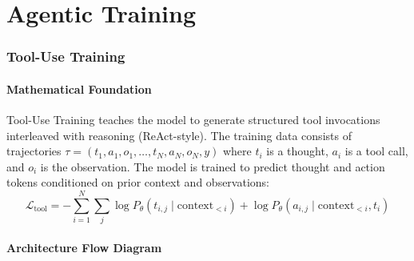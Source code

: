 \newpage
\part{Agentic Training}

\section{Tool-Use Training}

\subsection{Mathematical Foundation}
Tool-Use Training teaches the model to generate structured tool invocations interleaved with reasoning (ReAct-style). The training data consists of trajectories $\tau = (t_1, a_1, o_1, \ldots, t_N, a_N, o_N, y)$ where $t_i$ is a thought, $a_i$ is a tool call, and $o_i$ is the observation. The model is trained to predict thought and action tokens conditioned on prior context and observations:
\begin{equation}
  \mathcal{L}_{\text{tool}} = -\sum_{i=1}^N \sum_j \log P_\theta(t_{i,j} \mid \text{context}_{<i}) + \log P_\theta(a_{i,j} \mid \text{context}_{<i}, t_i)
\end{equation}

\subsection{Architecture Flow Diagram}

